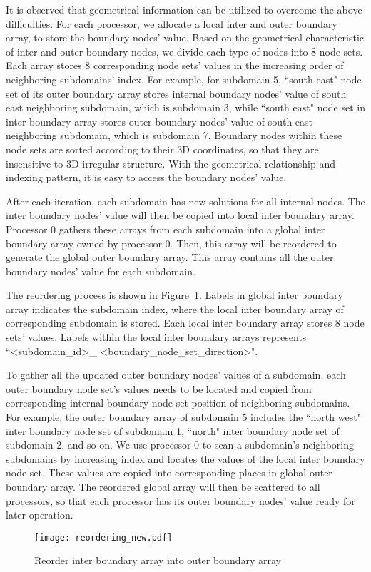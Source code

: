 \documentclass{sig-alternate}
\begin{document}
	It is observed that geometrical information can be utilized to overcome the above difficulties. For each processor, we allocate 
	a local inter and outer boundary array, to store the boundary nodes' value. Based on the geometrical 
	characteristic of inter and outer boundary nodes, we divide each type of nodes into 8 node sets. Each array stores 8 
	corresponding node sets' values in the increasing order of neighboring subdomains' index.  
	For example, for subdomain 5, ``south east" node set of its outer boundary array stores internal boundary nodes' value of 
	south east neighboring subdomain, which is subdomain 3, while ``south east" node set in inter boundary array stores outer 
	boundary nodes' value of south east neighboring subdomain, which is subdomain 7. Boundary nodes within 
	these node sets are sorted according to their 3D coordinates, so that they are insensitive to 3D irregular structure. With the
	geometrical relationship and indexing pattern, it is easy to access the boundary nodes' value. 

	After each iteration, each subdomain has new solutions for all internal nodes. The inter 
	boundary nodes' value will then be copied into local inter boundary array. Processor 0 gathers these arrays from each subdomain
	into a global inter boundary array owned by processor 0. Then, this array will be reordered to generate the global outer 
	boundary array. This array
	contains all the outer boundary nodes' value for each subdomain. 

	The reordering process is shown in Figure~\ref{Fig4}. Labels in global inter boundary array indicates the subdomain index, where
	the local inter boundary array of corresponding subdomain is stored. Each local inter boundary array stores 8 node sets' values. 
	Labels within the local inter boundary arrays represents ``<subdomain\_id>\_
	<boundary\_node\_set\_direction>".

	To gather all the updated outer boundary nodes' values of a subdomain, each outer boundary node set's values needs to be located
	and copied from corresponding internal boundary node set position of neighboring subdomains. For example, the 
	outer boundary array of subdomain 5 includes the ``north west" inter boundary node set of subdomain 1, ``north" inter boundary 
	node set of 
	subdomain 2, and so on. We use processor 0 to scan a subdomain's neighboring subdomains by increasing index and locates the
	values of the 
	local inter boundary node set. These values are copied into corresponding places in global outer boundary array. The 
	reordered global array will then be scattered to all processors, so that each processor has its outer boundary nodes' value 
	ready for later operation. 
	\begin{figure}[htbp]
	  \centering
	  \texttt{[image: reordering\_new.pdf]}
	  \caption{Reorder inter boundary array into outer boundary array}
	  \label{Fig4}
	\end{figure}
\end{document}
